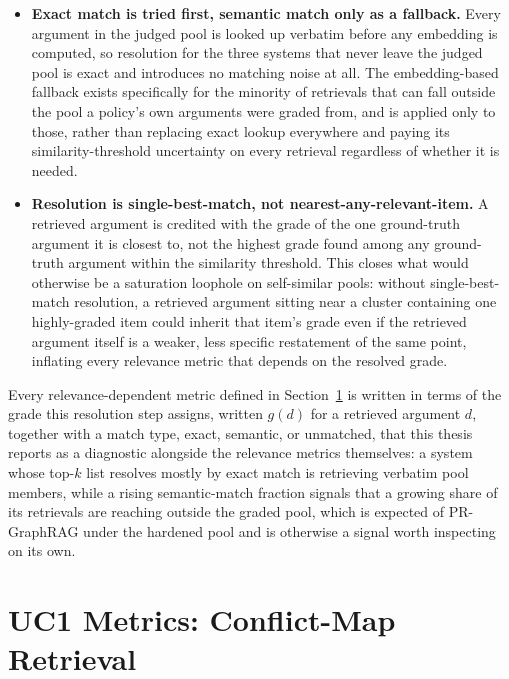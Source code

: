 \begin{itemize}
\item \textbf{Exact match is tried first, semantic match only as a fallback.} Every argument in the
judged pool is looked up verbatim before any embedding is computed, so resolution for the three
systems that never leave the judged pool is exact and introduces no matching noise at all. The
embedding-based fallback exists specifically for the minority of retrievals that can fall outside
the pool a policy's own arguments were graded from, and is applied only to those, rather than
replacing exact lookup everywhere and paying its similarity-threshold uncertainty on every
retrieval regardless of whether it is needed.

\item \textbf{Resolution is single-best-match, not nearest-any-relevant-item.} A retrieved argument
is credited with the grade of the one ground-truth argument it is closest to, not the highest grade
found among any ground-truth argument within the similarity threshold. This closes what would
otherwise be a saturation loophole on self-similar pools: without single-best-match resolution, a
retrieved argument sitting near a cluster containing one highly-graded item could inherit that
item's grade even if the retrieved argument itself is a weaker, less specific restatement of the
same point, inflating every relevance metric that depends on the resolved grade.
\end{itemize}

Every relevance-dependent metric defined in Section~\ref{sec:evaluation-uc1} is written in terms of
the grade this resolution step assigns, written $g(d)$ for a retrieved argument $d$, together with
a match type, exact, semantic, or unmatched, that this thesis reports as a diagnostic alongside the
relevance metrics themselves: a system whose top-$k$ list resolves mostly by exact match is
retrieving verbatim pool members, while a rising semantic-match fraction signals that a growing
share of its retrievals are reaching outside the graded pool, which is expected of PR-GraphRAG
under the hardened pool and is otherwise a signal worth inspecting on its own.

\section{UC1 Metrics: Conflict-Map Retrieval}
\label{sec:evaluation-uc1}

